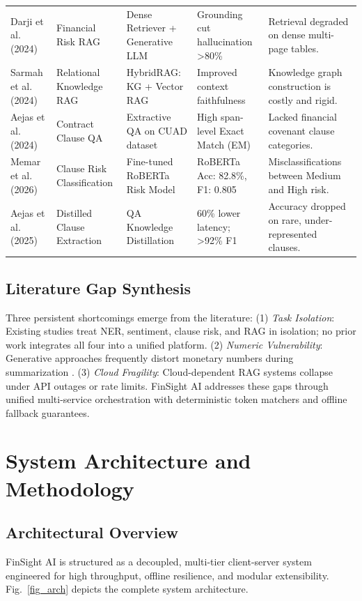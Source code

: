 \documentclass[conference]{IEEEtran}
\begin{document}
\begin{table}[t]
\begin{tabular}{@{}L{2.4cm} L{2.8cm} L{3.8cm} L{3.0cm} L{5.4cm}@{}}
\addlinespace[2pt]
Darji et al. (2024) \cite{b11} & Financial Risk RAG & Dense Retriever + Generative LLM & Grounding cut hallucination >80\% & Retrieval degraded on dense multi-page tables. \\
\addlinespace[2pt]
Sarmah et al. (2024) \cite{b12} & Relational Knowledge RAG & HybridRAG: KG + Vector RAG & Improved context faithfulness & Knowledge graph construction is costly and rigid. \\
\addlinespace[2pt]
Aejas et al. (2024) \cite{b13} & Contract Clause QA & Extractive QA on CUAD dataset & High span-level Exact Match (EM) & Lacked financial covenant clause categories. \\
\addlinespace[2pt]
Memar et al. (2026) \cite{b14} & Clause Risk Classification & Fine-tuned RoBERTa Risk Model & RoBERTa Acc: 82.8\%, F1: 0.805 & Misclassifications between Medium and High risk. \\
\addlinespace[2pt]
Aejas et al. (2025) \cite{b15} & Distilled Clause Extraction & QA Knowledge Distillation & 60\% lower latency; >92\% F1 & Accuracy dropped on rare, under-represented clauses. \\
\bottomrule
\end{tabular}
\end{table}

\subsection{Literature Gap Synthesis}
Three persistent shortcomings emerge from the literature: (1) \textit{Task Isolation}: Existing studies treat NER, sentiment, clause risk, and RAG in isolation; no prior work integrates all four into a unified platform. (2) \textit{Numeric Vulnerability}: Generative approaches frequently distort monetary numbers during summarization \cite{b4}. (3) \textit{Cloud Fragility}: Cloud-dependent RAG systems collapse under API outages or rate limits. FinSight AI addresses these gaps through unified multi-service orchestration with deterministic token matchers and offline fallback guarantees.

\section{System Architecture and Methodology}

\subsection{Architectural Overview}
FinSight AI is structured as a decoupled, multi-tier client-server system engineered for high throughput, offline resilience, and modular extensibility. Fig.~\ref{fig_arch} depicts the complete system architecture.
\end{document}
